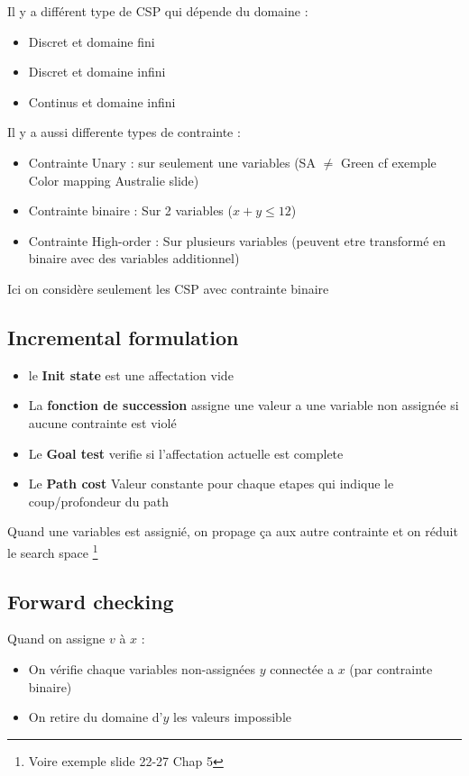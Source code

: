 	Il y a différent type de CSP qui dépende du domaine :
	\begin{itemize}
		\item Discret et domaine fini
		\item Discret et domaine infini
		\item Continus et domaine infini
	\end{itemize}
	
	Il y a aussi differente types de contrainte :
	\begin{itemize}
		\item Contrainte Unary : sur seulement une variables (SA $\neq$ Green cf exemple Color mapping Australie slide)
		\item Contrainte binaire : Sur 2 variables ($x+y \leq 12$)
		\item Contrainte High-order : Sur plusieurs variables (peuvent etre transformé en binaire avec des variables additionnel)
	\end{itemize}
		
		Ici on considère seulement les CSP avec contrainte binaire
	
	
	\subsection{Incremental formulation}
		\begin{itemize}
			\item le \textbf{Init state} est une affectation vide
			\item La \textbf{fonction de succession} assigne une valeur a une variable non assignée si aucune contrainte est violé
			\item Le \textbf{Goal test} verifie si l'affectation actuelle est complete
			\item Le \textbf{Path cost} Valeur constante pour chaque etapes qui indique le coup/profondeur du path
		\end{itemize}
			
		Quand une variables est assignié, on propage ça aux autre contrainte et on réduit le search space \footnote{Voire exemple slide 22-27 Chap 5}
		
	\subsection{Forward checking}
		Quand on assigne $v$ à $x$ :
		\begin{itemize}
			\item On vérifie chaque variables non-assignées $y$ connectée a $x$ (par contrainte binaire)
			\item On retire du domaine d'$y$ les valeurs impossible
		\end{itemize}
		
